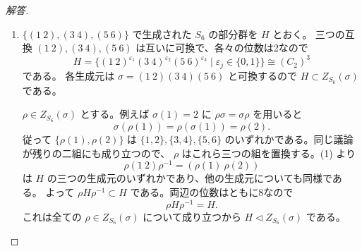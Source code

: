 \begin{proof}[解答]
\begin{enumerate}
  \item[(5)] $\{(1\ 2),(3\ 4),(5\ 6)\}$ で生成された $S_6$ の部分群を $H$ とおく。
  三つの互換 $(1\ 2),(3\ 4),(5\ 6)$ は互いに可換で、各々の位数は2なので
  \[
  H=\{(1\ 2)^{\varepsilon_1}(3\ 4)^{\varepsilon_2}
  (5\ 6)^{\varepsilon_3}\mid \varepsilon_j\in\{0,1\}\}
  \cong(C_2)^3
  \]
  である。
  各生成元は $\sigma=(1\ 2)(3\ 4)(5\ 6)$ と可換するので
  $H\subset Z_{S_6}(\sigma)$ である。

  $\rho\in Z_{S_6}(\sigma)$ とする。例えば
  $\sigma(1)=2$ に $\rho\sigma=\sigma\rho$ を用いると
  \[
  \sigma(\rho(1))=\rho(\sigma(1))=\rho(2).
  \]
  従って $\{\rho(1),\rho(2)\}$ は
  $\{1,2\},\{3,4\},\{5,6\}$ のいずれかである。同じ議論が残りの二組にも成り立つので、
  $\rho$ はこれら三つの組を置換する。(1) より
  \[
  \rho(1\ 2)\rho^{-1}=(\rho(1)\ \rho(2))
  \]
  は $H$ の三つの生成元のいずれかであり、他の生成元についても同様である。
  よって $\rho H\rho^{-1}\subset H$ である。両辺の位数はともに8なので
  \[
  \rho H\rho^{-1}=H.
  \]
  これは全ての $\rho\in Z_{S_6}(\sigma)$ について成り立つから
  $H\triangleleft Z_{S_6}(\sigma)$ である。
\end{enumerate}
\end{proof}

